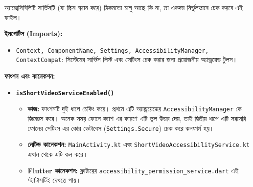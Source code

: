 \documentclass[12pt, a4paper]{article}
\begin{document}
\begin{tcolorbox}[colback=green!5!white,colframe=green!75!black,title={২. AccessibilityUtils.kt}]
অ্যাক্সেসিবিলিটি সার্ভিসটি (যা স্ক্রিন স্ক্যান করে) ঠিকমতো চালু আছে কি না, তা একদম নির্ভুলভাবে চেক করবে এই ফাইল।

\textbf{ইমপোর্টস (Imports):}
\begin{itemize}[label=$\circ$]
    \item \texttt{Context, ComponentName, Settings, AccessibilityManager, ContextCompat}: সিস্টেমের সার্ভিস লিস্ট এবং সেটিংস চেক করার জন্য প্রয়োজনীয় অ্যান্ড্রয়েড টুলস।
\end{itemize}

\textbf{ফাংশন এবং কানেকশন:}
\begin{itemize}[label=$\circ$]
    \item \textbf{\texttt{isShortVideoServiceEnabled()}}
    \begin{itemize}[label=--]
        \item \textbf{কাজ:} ফাংশনটি দুই ধাপে চেকিং করে। প্রথমে এটি অ্যান্ড্রয়েডের \texttt{AccessibilityManager} কে জিজ্ঞেস করে। অনেক সময় ফোনে ক্যাশ এর কারণে এটি ভুল উত্তর দেয়, তাই দ্বিতীয় ধাপে এটি সরাসরি ফোনের সেটিংস এর কোর ডেটাবেস (\texttt{Settings.Secure}) চেক করে কনফার্ম হয়। 
        \item \textbf{নেটিভ কানেকশন:} \texttt{MainActivity.kt} এবং \texttt{ShortVideoAccessibilityService.kt} এখান থেকে এটি কল করে।
        \item \textbf{Flutter কানেকশন:} ফ্লাটারের \texttt{accessibility\_permission\_service.dart} এই স্ট্যাটাসটিই দেখতে পায়।
    \end{itemize}
\end{itemize}
\end{tcolorbox}
\end{document}
